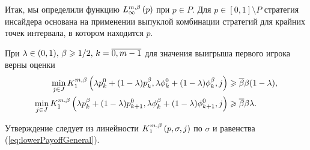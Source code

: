 Итак, мы определили функцию $L_{\infty}^{m,\beta}\left({p}\right)$ при $p \in P$. Для $p \in
[0, 1] \setminus P$ стратегия инсайдера основана на применении выпуклой
комбинации стратегий для крайних точек интервала, в котором находится
$p$.

\begin{proposition}
  \label{proposition:first:combination:step}
  При $\lambda \in (0, 1), \, \beta \geqslant 1/2, \, k = \overline{0, m-1}$
  для значения выигрыша первого игрока верны оценки
  \begin{align*}
    \min_{j \in J}
    \firstPlayerPayoff{1}{%
    \lambda \pEven + (1-\lambda) \pOdd}{%
    \lambda \fEven + (1-\lambda) \fOdd}{%
    j}
    &\geq \DCo \Co (1-\lambda), \\
    \min_{j \in J}
    \firstPlayerPayoff{1}{%
    \lambda \pOdd + (1-\lambda) \pEven[k+1]}{%
    \lambda \fOdd + (1-\lambda) \fEven[k+1]}{%
    j}
    &\geq \DCo \Co \lambda.
  \end{align*}
\end{proposition}
Утверждение следует из линейности $K_{1}^{m,\beta}\left({p}, {\sigma}, {j}\right)$
по $\sigma$ и равенства (\ref{eq:lowerPayoffGeneral}).

